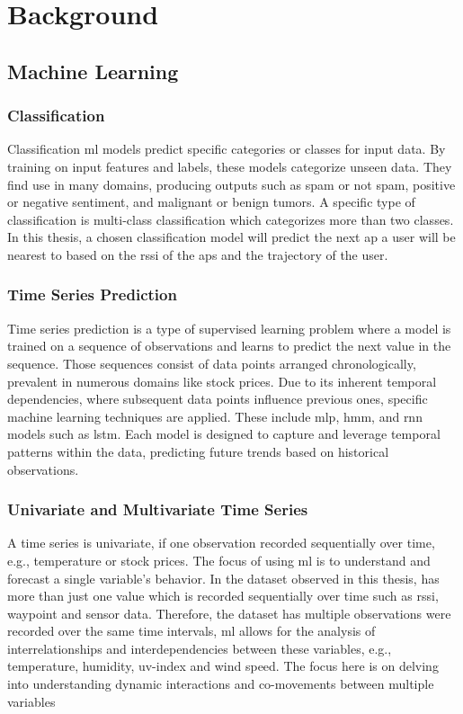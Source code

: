 \chapter{Background}\label{ch:background}

\section{Machine Learning}

\subsection{Classification}

Classification \ac{ml} models predict specific categories or classes for input data.
By training on input features and labels, these models categorize unseen data.
They find use in many domains, producing outputs such as spam or not spam, positive or negative sentiment, and malignant or benign tumors.
A specific type of classification is multi-class classification which categorizes more than two classes. \cite[pp.179-182]{BishopPatternRecognition}
In this thesis, a chosen classification model will predict the next \ac{ap} a user will be nearest to based on the \ac{rssi} of the \acp{ap} and the trajectory of the user.


\subsection{Time Series Prediction}

Time series prediction is a type of supervised learning problem where a model is trained on a sequence of observations and learns to predict the next value in the sequence.
Those sequences consist of data points arranged chronologically, prevalent in numerous domains like stock prices.
Due to its inherent temporal dependencies, where subsequent data points influence previous ones, specific machine learning techniques are applied.
These include \ac{mlp}, \ac{hmm}, and \ac{rnn} models such as \ac{lstm}.
Each model is designed to capture and leverage temporal patterns within the data, predicting future trends based on historical observations. \cite{neptune-ai}


\subsection{Univariate and Multivariate Time Series}

A time series is univariate, if one observation recorded sequentially over time, e.g., temperature or stock prices.
The focus of using \ac{ml} is to understand and forecast a single variable's behavior.
In the dataset observed in this thesis, has more than just one value which is recorded sequentially over time such as \ac{rssi}, waypoint and sensor data.  
Therefore, the dataset has multiple observations were recorded over the same time intervals, \ac{ml} allows for the analysis of interrelationships and interdependencies between these variables, e.g., temperature, humidity, uv-index and wind speed.
The focus here is on delving into understanding dynamic interactions and co-movements between multiple variables

